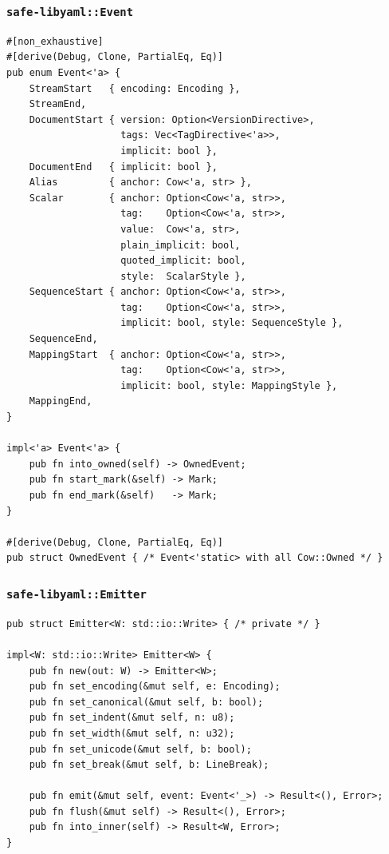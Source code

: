 \documentclass[12pt]{article}
\theoremstyle{definition}
\theoremstyle{remark}
\begin{document}
\subsubsection{\texttt{safe-libyaml::Event}}
\begin{lstlisting}
#[non_exhaustive]
#[derive(Debug, Clone, PartialEq, Eq)]
pub enum Event<'a> {
    StreamStart   { encoding: Encoding },
    StreamEnd,
    DocumentStart { version: Option<VersionDirective>,
                    tags: Vec<TagDirective<'a>>,
                    implicit: bool },
    DocumentEnd   { implicit: bool },
    Alias         { anchor: Cow<'a, str> },
    Scalar        { anchor: Option<Cow<'a, str>>,
                    tag:    Option<Cow<'a, str>>,
                    value:  Cow<'a, str>,
                    plain_implicit: bool,
                    quoted_implicit: bool,
                    style:  ScalarStyle },
    SequenceStart { anchor: Option<Cow<'a, str>>,
                    tag:    Option<Cow<'a, str>>,
                    implicit: bool, style: SequenceStyle },
    SequenceEnd,
    MappingStart  { anchor: Option<Cow<'a, str>>,
                    tag:    Option<Cow<'a, str>>,
                    implicit: bool, style: MappingStyle },
    MappingEnd,
}

impl<'a> Event<'a> {
    pub fn into_owned(self) -> OwnedEvent;
    pub fn start_mark(&self) -> Mark;
    pub fn end_mark(&self)   -> Mark;
}

#[derive(Debug, Clone, PartialEq, Eq)]
pub struct OwnedEvent { /* Event<'static> with all Cow::Owned */ }
\end{lstlisting}

\subsubsection{\texttt{safe-libyaml::Emitter}}
\begin{lstlisting}
pub struct Emitter<W: std::io::Write> { /* private */ }

impl<W: std::io::Write> Emitter<W> {
    pub fn new(out: W) -> Emitter<W>;
    pub fn set_encoding(&mut self, e: Encoding);
    pub fn set_canonical(&mut self, b: bool);
    pub fn set_indent(&mut self, n: u8);
    pub fn set_width(&mut self, n: u32);
    pub fn set_unicode(&mut self, b: bool);
    pub fn set_break(&mut self, b: LineBreak);

    pub fn emit(&mut self, event: Event<'_>) -> Result<(), Error>;
    pub fn flush(&mut self) -> Result<(), Error>;
    pub fn into_inner(self) -> Result<W, Error>;
}
\end{lstlisting}
\end{document}

